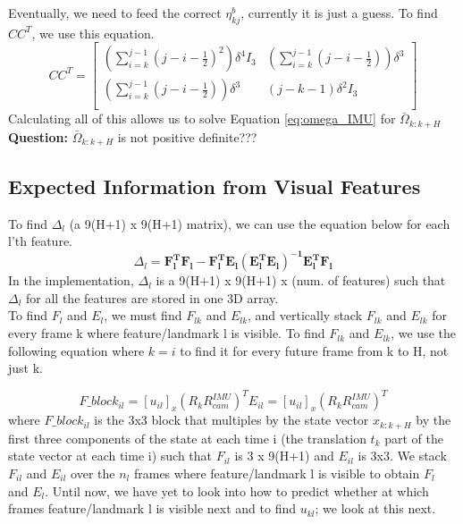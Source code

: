 Eventually, we need to feed the correct $\eta_{kj}^b$, currently it is just a guess. To find $CC^T$, we use this equation.
\[CC^T =
\begin{bmatrix}
(\sum_{i=k}^{j-1}(j-i-\frac{1}{2})^2)\delta^4 I_3 & (\sum_{i=k}^{j-1}(j-i-\frac{1}{2}))\delta^3 \\
(\sum_{i=k}^{j-1}(j-i-\frac{1}{2}))\delta^3  &
(j-k-1)\delta^2I_3 \\
\end{bmatrix}
\]
Calculating all of this allows us to solve Equation \ref{eq:omega_IMU} for $\bar{\Omega}_{k:k+H}$ \\
\textbf{Question: } $\bar{\Omega}_{k:k+H}$ is not positive definite???

\subsection{Expected Information from Visual Features}\label{sub:info_features}

To find $\Delta_l$ (a 9(H+1) x 9(H+1) matrix), we can use the equation below for each l'th feature. 
\begin{equation}
    \Delta_l = \mathbf{F_l^TF_l - F_l^TE_l(E_l^TE_l)^{-1}E_l^TF_l}
\end{equation}
In the implementation, $\Delta_l$ is a 9(H+1) x 9(H+1) x (num. of features) such that $\Delta_l$ for all the features are stored in one 3D array.\\

To find $F_l$ and $E_l$, we must find $F_{lk}$ and $E_{lk}$, and vertically stack $F_{lk}$ and $E_{lk}$ for every frame k where feature/landmark l is visible. To find 
$F_{lk}$ and $E_{lk}$, we use the following equation where $k = i$ to find it for every future frame from k to H, not just k. 

\begin{equation}
    F\_block_{il} = [u_{il}]_x(R_kR_{cam}^{IMU})^T
    E_{il} = [u_{il}]_x(R_kR_{cam}^{IMU})^T
\end{equation}
where $F\_block_{il}$ is the 3x3 block that multiples by the state vector $x_{k:k+H}$ by the first three components of the state at each time i (the translation $t_k$ part of the state vector at each time i) such that $F_{il}$ is 3 x 9(H+1)  and $E_{il}$ is 3x3. We stack $F_{il}$ and $E_{il}$ over the $n_l$ frames where feature/landmark l is visible to obtain $F_l$ and $E_l$. Until now, we have yet to look into how to predict whether at which frames feature/landmark l is visible next and to find $u_{kl}$; we look at this next. 
